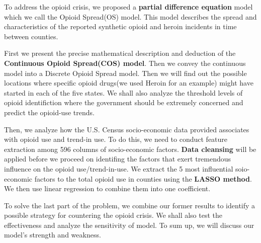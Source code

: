 To address the opioid crisis, we proposed a \textbf{partial difference equation} model which we call the Opioid Spread(OS) model. This model describes the spread and characteristics of the reported synthetic opioid and heroin incidents in time between counties.

First we present the precise mathematical description and deduction of the \textbf{Continuous Opioid Spread(COS) model}. Then we convey the continuous model into a Discrete Opioid Spread model. Then we will find out the possible locations where specific opioid drugs(we used Heroin for an example) might have started in each of the five states. We shall also analyze the threshold levels of opioid identifiction where the government should be extremely concerned and predict the opioid-use trends.

Then, we analyze how the U.S. Census socio-economic data provided associates with opioid use and trend-in use. To do this, we need to conduct feature extraction among 596 columns of socio-economic factors. \textbf{Data cleansing} will be applied before we proceed on identifing the factors that exert tremendous influence on the opioid use/trend-in-use. We extract the  5 most influential soio-economic factors to the total opioid use in counties using the \textbf{LASSO method}. We then use linear regression to combine them into one coefficient.

To solve the last part of the problem, we combine our former results to identify a possible strategy for countering the opioid crisis. We shall also test the effectiveness and analyze the sensitivity of model. To sum up, we will discuss our model's strength and weakness.





